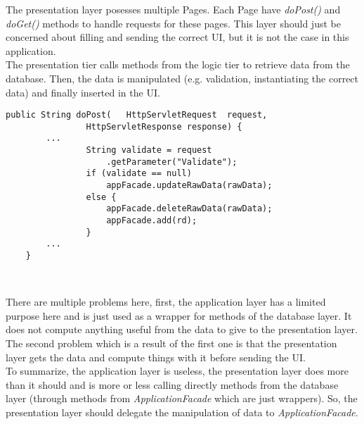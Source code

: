 The presentation layer posesses multiple Pages. Each Page have \emph{doPost()}
and \emph{doGet()} methods to handle requests for these pages. This layer should
just be concerned about filling and sending the correct UI, but it is not the
case in this application.\\

The presentation tier calls methods from the logic tier to retrieve data from
the database. Then, the data is manipulated (e.g. validation, instantiating the
correct data) and finally inserted in the UI.\\

\begin{lstlisting}[caption={data validation in AdministrationPage}]
	public String doPost(	HttpServletRequest	request,
				HttpServletResponse	response) {
		...
				String validate = request
					.getParameter("Validate");
				if (validate == null)
					appFacade.updateRawData(rawData);
				else {
					appFacade.deleteRawData(rawData);
					appFacade.add(rd);
				}
        ...
    }
\end{lstlisting}
\

There are multiple problems here, first, the application layer has a limited
purpose here and is just used as a wrapper for methods of the database layer. It
does not compute anything useful from the data to give to the presentation layer.
The second problem which is a result of the first one is that the presentation
layer gets the data and compute things with it before sending the UI.\\

To summarize, the application layer is useless, the presentation layer does
more than it should and is more or less calling directly methods from the
database layer (through methods from \emph{ApplicationFacade} which are just
wrappers). So, the presentation layer should delegate the manipulation of data
to \emph{ApplicationFacade}.

\newpage
